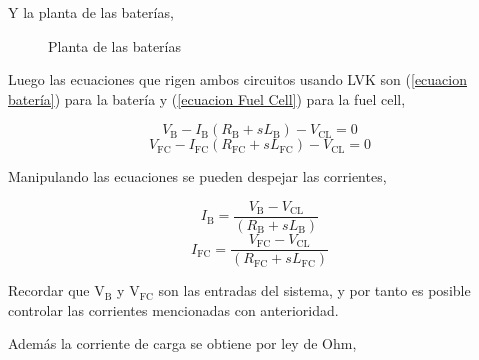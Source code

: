 Y la planta de las baterías,

\begin{figure}[H] %
    \centering
    \caption{Planta de las baterías}
    \label{circ:planta_b}
\end{figure}
Luego las ecuaciones que rigen ambos circuitos usando LVK son (\ref{ecuacion batería}) para la batería y (\ref{ecuacion Fuel Cell}) para la fuel cell,

\begin{equation}\label{ecuacion batería}
    V_{\text{B}} - I_{\text{B}}(R_{\text{B}} + sL_{\text{B}}) - V_{\text{CL}} = 0
\end{equation}
\begin{equation}\label{ecuacion Fuel Cell}
    V_{\text{FC}} - I_{\text{FC}}(R_{\text{FC}} + sL_{\text{FC}}) - V_{\text{CL}} = 0
\end{equation}

Manipulando las ecuaciones se pueden despejar las corrientes,

\begin{equation}
    I_{\text{B}} = \frac{V_{\text{B}}- V_{\text{CL}}}{(R_{\text{B}} + sL_{\text{B}})} 
\end{equation}
\begin{equation}
    I_{\text{FC}} = \frac{V_{\text{FC}}- V_{\text{CL}}}{(R_{\text{FC}} + sL_{\text{FC}})} 
\end{equation}

Recordar que V$_{\text{B}}$ y V$_{\text{FC}}$ son las entradas del sistema, y por tanto es posible controlar las corrientes mencionadas con anterioridad.

Además la corriente de carga se obtiene por ley de Ohm,


